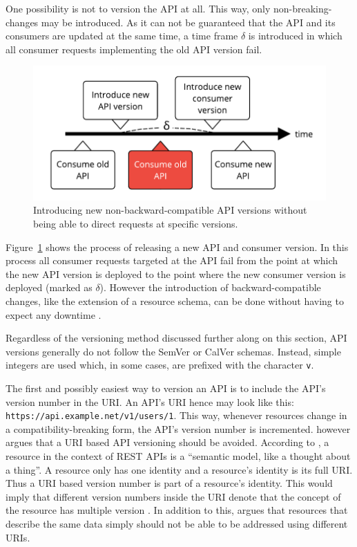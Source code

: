 One possibility is not to version the \ac{API} at all. This way, only
non-breaking-changes may be introduced. As it can not be guaranteed that the
\ac{API} and its consumers are updated at the same time, a time frame $\delta$
is introduced in which all consumer requests implementing the old \ac{API}
version fail.

\begin{figure}[H]
\begin{center}
  \includegraphics[scale=0.7]{images/figures/api_releases.pdf}
\end{center}
\caption{Introducing new non-backward-compatible \ac{API} versions without being able to direct requests at specific versions.}%
\label{fig:api_releases}
\end{figure}

Figure~\ref{fig:api_releases} shows the process of releasing a new \ac{API} and
consumer version. In this process all consumer requests targeted at the
\ac{API} fail from the point at which the new \ac{API} version is deployed to
the point where the new consumer version is deployed (marked as $\delta$).
However the introduction of backward-compatible changes, like the extension of
a resource schema, can be done without having to expect any downtime
\autocite{MicrosoftAPIdesign2018}.

Regardless of the versioning method discussed further along on this section,
\ac{API} versions generally do not follow the SemVer or CalVer schemas.
Instead, simple integers are used which, in some cases, are prefixed with the
character \texttt{v}.

The first and possibly easiest way to version an \ac{API} is to include the
\ac{API}'s version number in the \ac{URI}. An \ac{API}'s \ac{URI} hence may
look like this: \texttt{https://api.example.net/v1/users/1}. This way, whenever
resources change in a compatibility-breaking form, the \ac{API}'s version
number is incremented. \autocite[Ch. 6]{MasseRESTAPIDesign2011} however argues
that a \ac{URI} based \ac{API} versioning should be avoided. According to
\autocite{MasseRESTAPIDesign2011}, a resource in the context of \ac{REST}
\acp{API} is a \enquote{semantic model, like a thought about a thing}.
A resource only has one identity and a resource's identity
is its full \ac{URI}. Thus a \ac{URI} based version number is part of a
resource's identity. This would imply that different version numbers inside the
\ac{URI} denote that the concept of the resource has multiple version
\autocite[Ch. 6]{MasseRESTAPIDesign2011}. In addition to this,
\autocite{MicrosoftAPIdesign2018} argues that resources that describe the same
data simply should not be able to be addressed using different \acp{URI}.

